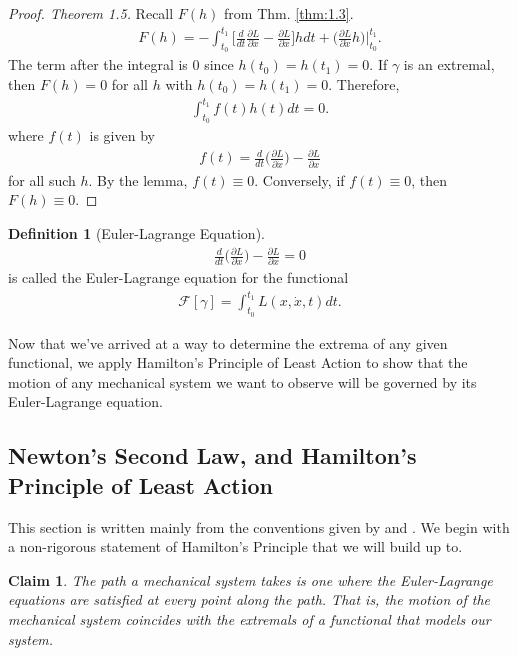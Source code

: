 \documentclass[10pt, psamsfonts]{amsart}
\newtheorem{claim}[thm]{Claim}
\theoremstyle{definition}
\newtheorem{defn}[thm]{Definition}
\theoremstyle{remark}
\numberwithin{equation}{section}
\begin{document}
\begin{proof}[Proof. Theorem 1.5]
Recall $F(h)$ from Thm. \ref{thm:1.3}.
\begin{align*}
  F(h) = - \int_{t_0}^{t_1} \bigg[\frac{d}{dt} \frac{\partial L}{\partial \dot{x}} -  \frac{\partial L}{\partial x} \bigg] h dt + \bigg(\frac{\partial L}{\partial \dot{x}}h \bigg)\bigg|_{t_0}^{t_1}.
\end{align*}
The term after the integral is 0 since $h(t_0) = h(t_1) = 0.$ If $\gamma$ is an extremal, then $F(h) = 0$ for all $h$ with $h(t_0) = h(t_1) = 0$. Therefore,
\begin{align*}
  \int_{t_0}^{t_1} f(t)h(t)dt = 0.
\end{align*}
where $f(t)$ is given by
\begin{align*}
  f(t) = \frac{d}{dt} \bigg(\frac{\partial L}{\partial \dot{x}}  \bigg) - \frac{\partial L}{\partial x} 
\end{align*}
for all such $h$. By the lemma, $f(t) \equiv 0$. Conversely, if $f(t) \equiv 0$, then $F(h) \equiv 0$.
\end{proof}

\begin{defn}[Euler-Lagrange Equation]
\begin{align*}
  \frac{d}{dt} \bigg(\frac{\partial L}{\partial \dot{x}}  \bigg) - \frac{\partial L}{\partial x} = 0 
\end{align*}
is called the Euler-Lagrange equation for the functional 
\begin{align*}
    \mathcal{F}[\gamma] = \int_{t_0}^{t_1}L(x, \dot{x}, t)dt.
\end{align*}
\end{defn}

Now that we've arrived at a way to determine the extrema of any given functional, we apply Hamilton's Principle of Least Action to show that the motion of any mechanical system we want to observe will be governed by its Euler-Lagrange equation.

\subsection{Newton's Second Law, and Hamilton's Principle of Least Action}
This section is written mainly from the conventions given by \cite[Arnold]{2} and \cite[Taylor]{3}.  We begin with a non-rigorous statement of Hamilton's Principle that we will build up to.
\begin{claim}
The path a mechanical system takes is one where the Euler-Lagrange equations are satisfied at every point along the path. That is, the motion of the mechanical system coincides with the extremals of a functional that models our system.
\end{claim}
\end{document}
